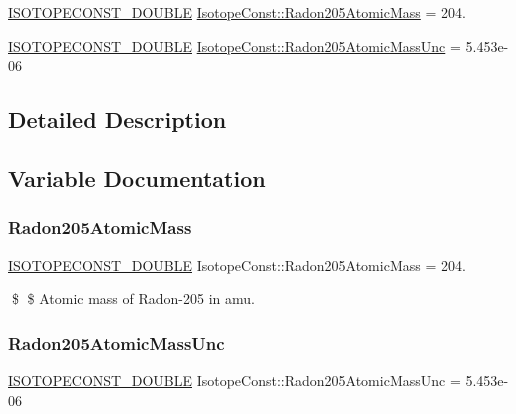 \begin{DoxyCompactItemize}
\item 
\mbox{\hyperlink{group___isotope_const-_macros_ga8f45a7272ce02c0b4c65c44636ed719a}{I\+S\+O\+T\+O\+P\+E\+C\+O\+N\+S\+T\+\_\+\+D\+O\+U\+B\+LE}} \mbox{\hyperlink{group___isotope_const-_radon-_rn205_gafb56e9362698a0ba45967f0b22eba4eb}{Isotope\+Const\+::\+Radon205\+Atomic\+Mass}} = 204.
\item 
\mbox{\hyperlink{group___isotope_const-_macros_ga8f45a7272ce02c0b4c65c44636ed719a}{I\+S\+O\+T\+O\+P\+E\+C\+O\+N\+S\+T\+\_\+\+D\+O\+U\+B\+LE}} \mbox{\hyperlink{group___isotope_const-_radon-_rn205_ga5d8f01d6a22a51ca144c267d593a4bef}{Isotope\+Const\+::\+Radon205\+Atomic\+Mass\+Unc}} = 5.\+453e-\/06
\end{DoxyCompactItemize}


\subsection{Detailed Description}


\subsection{Variable Documentation}
\mbox{\label{group___isotope_const-_radon-_rn205_gafb56e9362698a0ba45967f0b22eba4eb}} 
\subsubsection{\texorpdfstring{Radon205\+Atomic\+Mass}{Radon205AtomicMass}}
{\footnotesize\ttfamily \mbox{\hyperlink{group___isotope_const-_macros_ga8f45a7272ce02c0b4c65c44636ed719a}{I\+S\+O\+T\+O\+P\+E\+C\+O\+N\+S\+T\+\_\+\+D\+O\+U\+B\+LE}} Isotope\+Const\+::\+Radon205\+Atomic\+Mass = 204.}

\$ \$ Atomic mass of Radon-\/205 in amu. \mbox{\label{group___isotope_const-_radon-_rn205_ga5d8f01d6a22a51ca144c267d593a4bef}} 
\subsubsection{\texorpdfstring{Radon205\+Atomic\+Mass\+Unc}{Radon205AtomicMassUnc}}
{\footnotesize\ttfamily \mbox{\hyperlink{group___isotope_const-_macros_ga8f45a7272ce02c0b4c65c44636ed719a}{I\+S\+O\+T\+O\+P\+E\+C\+O\+N\+S\+T\+\_\+\+D\+O\+U\+B\+LE}} Isotope\+Const\+::\+Radon205\+Atomic\+Mass\+Unc = 5.\+453e-\/06}

